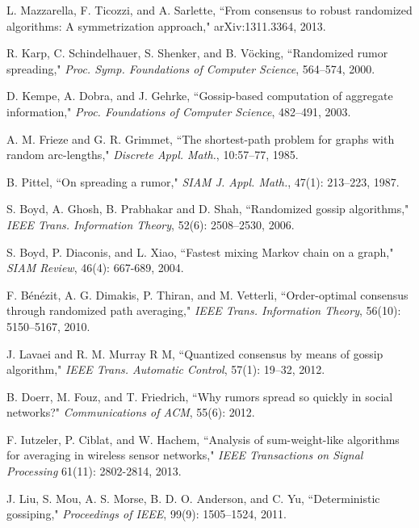 \documentclass[a4paper, 11pt]{article}
\begin{document}
\begin{thebibliography}{99}
 L. Mazzarella, F. Ticozzi, and A. Sarlette, ``From consensus to robust
randomized algorithms: A symmetrization approach," arXiv:1311.3364, 2013.

  R. Karp, C. Schindelhauer, S.  Shenker,  and B. V\"{o}cking, ``Randomized
rumor spreading," {\em Proc. Symp. Foundations of Computer Science}, 564--574, 2000.


  D. Kempe,  A. Dobra,  and J. Gehrke,  ``Gossip-based computation of aggregate
information,"  {\em Proc. Foundations of Computer Science},  482--491, 2003.


 A. M. Frieze  and G. R.   Grimmet, ``The shortest-path problem for graphs with random arc-lengths," {\em
Discrete Appl. Math.}, 10:57--77, 1985.

 B. Pittel, ``On spreading a rumor," {\em SIAM J. Appl. Math.}, 47(1): 213--223, 1987.




  S. Boyd, A.  Ghosh, B.  Prabhakar  and D.  Shah, ``Randomized gossip algorithms," {\em IEEE Trans.
Information Theory}, 52(6): 2508--2530, 2006.



 S. Boyd,  P. Diaconis, and
 L. Xiao, ``Fastest mixing Markov chain on a graph," {\em SIAM Review},  46(4): 667-689, 2004.


  F. B\'{e}n\'{e}zit, A. G. Dimakis,   P. Thiran, and M.  Vetterli, ``Order-optimal consensus through randomized path averaging," {\em IEEE Trans.  Information Theory}, 56(10): 5150--5167, 2010.



  J. Lavaei  and R. M. Murray R M, ``Quantized consensus by means of gossip algorithm,"  {\em
IEEE Trans. Automatic Control}, 57(1): 19--32, 2012.



 B. Doerr, M. Fouz, and T. Friedrich, ``Why rumors spread so quickly in social networks?" {\em Communications of ACM}, 55(6): 2012.

 F. Iutzeler, P.  Ciblat,  and W. Hachem,  ``Analysis of sum-weight-like algorithms
for averaging in wireless sensor networks," {\em IEEE Transactions
on Signal Processing} 61(11): 2802-2814, 2013.






 J. Liu, S. Mou,
A. S. Morse,  B. D. O.  Anderson, and
C. Yu, ``Deterministic gossiping," {\em Proceedings of IEEE},  99(9): 1505--1524, 2011.



\end{thebibliography}
\end{document}
